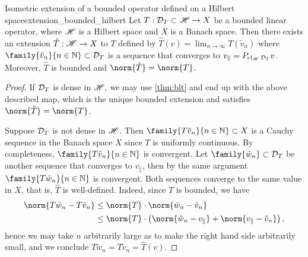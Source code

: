 \begin{proposition}{Isometric extension of a bounded operator defined on a Hilbert space}{extension_bounded_hilbert}
    Let \(T : \mathcal{D}_{T} \subset \mathscr{H} \to X\) be a bounded linear operator, where \(\mathscr{H}\) is a Hilbert space and \(X\) is a Banach space. Then there exists an extension \(\hat{T} : \mathscr{H} \to X\) to \(T\) defined by \(\hat{T}(v) = \lim_{n \to \infty} T(\tilde{v}_n)\) where \(\family{\tilde{v}_n}{n \in \mathbb{N}} \subset \domain{T}\) is a sequence that converges to \(v_\parallel = P_{\operatorname{cl}_{\mathscr{H}}{\mathcal{D}_{T}}}v\). Moreover, \(\hat{T}\) is bounded and \(\norm{\hat{T}} = \norm{T}\).
\end{proposition}
\begin{proof}
    If \(\mathcal{D}_{T}\) is dense in \(\mathscr{H},\) we may use \cref{thm:blt} and end up with the above described map, which is the unique bounded extension and satisfies \(\norm{\hat{T}} = \norm{T}\).

    Suppose \(\mathcal{D}_{T}\) is not dense in \(\mathscr{H}\). Then \(\family{T\tilde{v}_n}{n \in \mathbb{N}} \subset X\) is a Cauchy sequence in the Banach space \(X\) since \(T\) is uniformly continuous. By completeness, \(\family{T\tilde{v}_n}{n \in \mathbb{N}}\) is convergent. Let \(\family{\tilde{w}_n} \subset \domain{T}\) be another sequence that converges to \(v_\parallel\), then by the same argument \(\family{T\tilde{w}_n}{n \in \mathbb{N}}\) is convergent. Both sequences converge to the same value in \(X\), that is, \(\hat{T}\) is well-defined. Indeed, since \(T\) is bounded, we have
    \begin{align*}
        \norm{T\tilde{w}_n - T\tilde{v}_n} &\leq \norm{T}\cdot \norm{\tilde{w}_n - \tilde{v}_n}\\
                                           &\leq \norm{T} \cdot \left(\norm{\tilde{w}_n - v_\parallel} + \norm{v_\parallel - \tilde{v}_n}\right),
    \end{align*}
    hence we may take \(n\) arbitrarily large as to make the right hand side arbitrarily small, and we conclude \(T\tilde{w}_n = T\tilde{v}_n = \hat{T}(v)\).


\end{proof}
